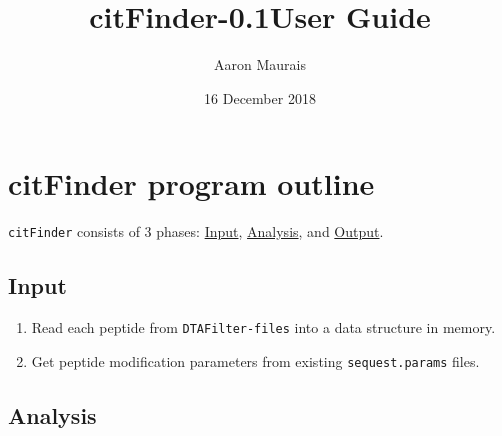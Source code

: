 \documentclass[12pt]{article}
\newcommand{\VERSION}{0.1}
\begin{document}
	
	\title{citFinder-\VERSION \space User Guide}
	\author{Aaron Maurais}
	\date{16 December 2018}
	
	\maketitle
	\tableofcontents
	\newpage

	\section{citFinder program outline} %
	\label{sec:citfinder_program_outline}

	\texttt{citFinder} consists of 3 phases: \hyperref[sub:input]{Input}, \hyperref[sub:analysis]{Analysis}, and \hyperref[sub:output]{Output}.

	\subsection{Input} %
	\label{sub:input}

	\begin{enumerate}
		\item Read each peptide from \texttt{DTAFilter-files} into a data structure in memory.
		\item Get peptide modification parameters from existing \texttt{sequest.params} files.
	\end{enumerate}


	\subsection{Analysis} %
	\label{sub:analysis}
	
\end{document}
